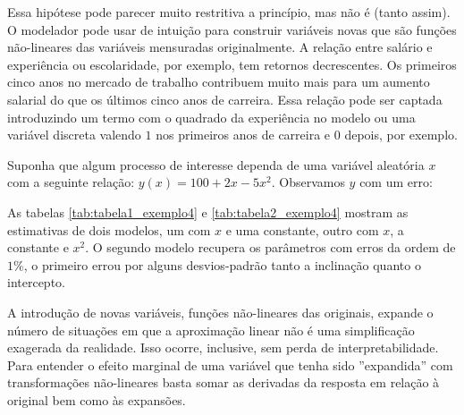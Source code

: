 Essa hipótese pode parecer muito restritiva a princípio, mas não é (tanto assim). O modelador pode usar de intuição para construir variáveis novas que são funções não-lineares das variáveis mensuradas originalmente. A relação entre salário e experiência ou escolaridade, por exemplo, tem retornos decrescentes. Os primeiros cinco anos no mercado de trabalho contribuem muito mais para um aumento salarial do que os últimos cinco anos de carreira. Essa relação pode ser captada introduzindo um termo com o quadrado da experiência no modelo ou uma variável discreta valendo $1$ nos primeiros anos de carreira e $0$ depois, por exemplo. 

\begin{exemplo}

Suponha que algum processo de interesse dependa de uma variável aleatória $x$ com a seguinte relação: $y(x) = 100 + 2x - 5x^2$. Observamos $y$ com um erro:

\begin{figure}[H]
    \centering
    
\end{figure}

As tabelas \ref{tab:tabela1_exemplo4} e \ref{tab:tabela2_exemplo4} mostram as estimativas de dois modelos, um com $x$ e uma constante, outro com $x$, a constante e $x^2$. O segundo modelo recupera os parâmetros com erros da ordem de $1\%$, o primeiro errou por alguns desvios-padrão tanto a inclinação quanto o intercepto. 




A introdução de novas variáveis, funções não-lineares das originais, expande o número de situações em que a aproximação linear não é uma simplificação exagerada da realidade. Isso ocorre, inclusive, sem perda de interpretabilidade. Para entender o efeito marginal de uma variável que tenha sido ''expandida'' com transformações não-lineares basta somar as derivadas da resposta em relação à original bem como às expansões.


\end{exemplo}

